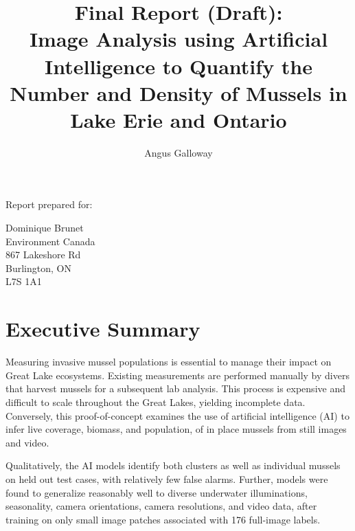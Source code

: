 \documentclass[11pt]{article} %
\title{Final Report (Draft): \\
Image Analysis using Artificial Intelligence to
Quantify the Number and Density of Mussels in Lake Erie and Ontario}
\author{Angus Galloway}
\begin{document}
\maketitle

\thispagestyle{empty}

\vspace{5cm}

\begin{centering}

Report prepared for:

\vspace{1cm}

Dominique Brunet \\ 
Environment Canada \\ 
867 Lakeshore Rd \\
Burlington, ON \\
L7S 1A1 

\end{centering}

\clearpage


\setcounter{page}{1}

\section*{Executive Summary}

Measuring invasive mussel populations is essential to manage their impact on 
Great Lake ecosystems. Existing measurements are performed manually by divers 
that harvest mussels for a subsequent lab analysis. This process is expensive 
and difficult to scale throughout the Great Lakes, yielding incomplete data. 
Conversely, this proof-of-concept examines the use of artificial intelligence
(AI) to infer live coverage, biomass, and population, of in place mussels from
still images and video.

Qualitatively, the AI models identify both clusters as well as individual 
mussels on held out test cases, with relatively few false alarms. Further, 
models were found to generalize reasonably well to diverse underwater 
illuminations, seasonality, camera orientations, camera resolutions, and video 
data, after training on only small image patches associated with 176 full-image 
labels. 
\end{document}
